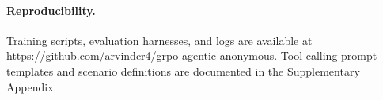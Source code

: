 \documentclass{article}
\begin{document}
\paragraph{Reproducibility.} Training scripts, evaluation harnesses, and logs are available at \url{https://github.com/arvindcr4/grpo-agentic-anonymous}. Tool-calling prompt templates and scenario definitions are documented in the Supplementary Appendix.




% 
\end{document}
